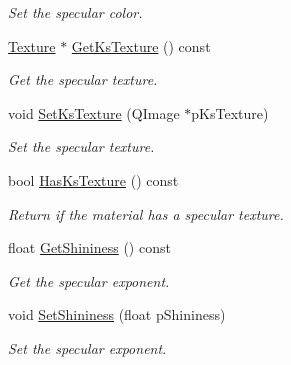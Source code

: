 \begin{DoxyCompactItemize}
\begin{DoxyCompactList}\small\item\em Set the specular color. \end{DoxyCompactList}\item 
\hyperlink{class_texture}{Texture} $\ast$ \hyperlink{class_material_a44d094929f0a7adc468eec263763c898}{Get\+Ks\+Texture} () const 
\begin{DoxyCompactList}\small\item\em Get the specular texture. \end{DoxyCompactList}\item 
void \hyperlink{class_material_acf0f2ffdc24201bd916a7bb8acf0e521}{Set\+Ks\+Texture} (Q\+Image $\ast$p\+Ks\+Texture)
\begin{DoxyCompactList}\small\item\em Set the specular texture. \end{DoxyCompactList}\item 
bool \hyperlink{class_material_af88e1c29b602ece37d4909d16d86486c}{Has\+Ks\+Texture} () const 
\begin{DoxyCompactList}\small\item\em Return if the material has a specular texture. \end{DoxyCompactList}\item 
float \hyperlink{class_material_a27d724af8a76dc8d64f8ffeb555aa00e}{Get\+Shininess} () const 
\begin{DoxyCompactList}\small\item\em Get the specular exponent. \end{DoxyCompactList}\item 
void \hyperlink{class_material_af4dba9c45ace133e672e25150517d15b}{Set\+Shininess} (float p\+Shininess)
\begin{DoxyCompactList}\small\item\em Set the specular exponent. \end{DoxyCompactList}\end{DoxyCompactItemize}
